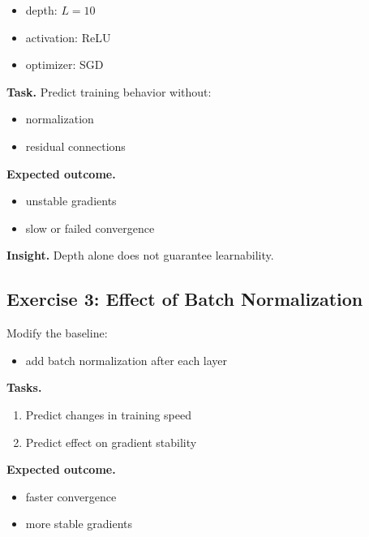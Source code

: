 \begin{itemize}
    \item depth: $L = 10$
    \item activation: ReLU
    \item optimizer: SGD
\end{itemize}

\medskip

\noindent
\textbf{Task.}  
Predict training behavior without:
\begin{itemize}
    \item normalization
    \item residual connections
\end{itemize}

\medskip

\noindent
\textbf{Expected outcome.}

\begin{itemize}
    \item unstable gradients
    \item slow or failed convergence
\end{itemize}

\medskip

\noindent
\textbf{Insight.}  
Depth alone does not guarantee learnability.

\subsection{Exercise 3: Effect of Batch Normalization}

Modify the baseline:

\begin{itemize}
    \item add batch normalization after each layer
\end{itemize}

\medskip

\noindent
\textbf{Tasks.}
\begin{enumerate}
    \item Predict changes in training speed
    \item Predict effect on gradient stability
\end{enumerate}

\medskip

\noindent
\textbf{Expected outcome.}

\begin{itemize}
    \item faster convergence
    \item more stable gradients
\end{itemize}

